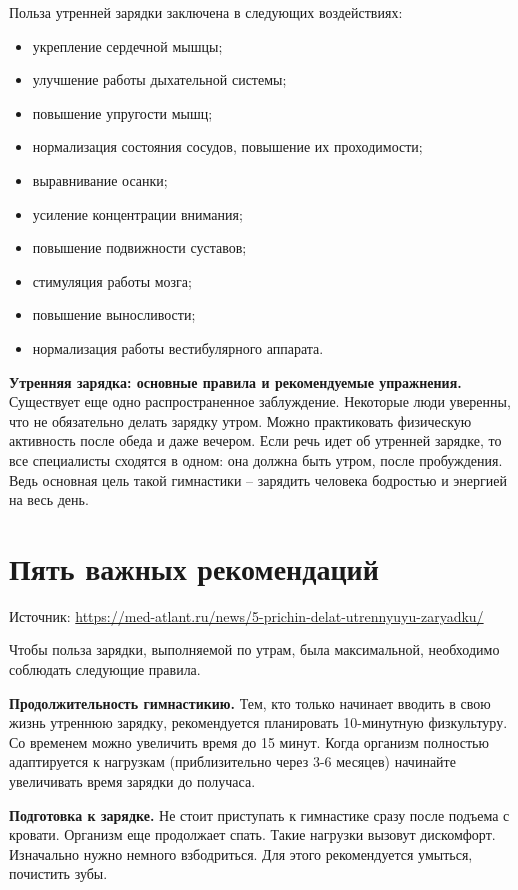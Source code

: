 Польза утренней зарядки заключена в следующих воздействиях:

\begin{itemize}
    \item укрепление сердечной мышцы;
    \item улучшение работы дыхательной системы;
    \item повышение упругости мышц;
    \item нормализация состояния сосудов, повышение их проходимости;
    \item выравнивание осанки;
    \item усиление концентрации внимания;
    \item повышение подвижности суставов;
    \item стимуляция работы мозга;
    \item повышение выносливости;
    \item нормализация работы вестибулярного аппарата.
\end{itemize}

\textbf{Утренняя зарядка: основные правила и рекомендуемые упражнения.} Существует еще одно распространенное заблуждение. Некоторые люди уверенны, что не обязательно делать зарядку утром. Можно практиковать физическую активность после обеда и даже вечером. Если речь идет об утренней зарядке, то все специалисты сходятся в одном: она должна быть утром, после пробуждения. Ведь основная цель такой гимнастики – зарядить человека бодростью и энергией на весь день.

\newpage
\section{Пять важных рекомендаций}
Источник: \url{https://med-atlant.ru/news/5-prichin-delat-utrennyuyu-zaryadku/}

Чтобы польза зарядки, выполняемой  по утрам, была максимальной, необходимо соблюдать следующие правила.

\textbf{Продолжительность гимнастикию.} Тем, кто только начинает вводить в свою жизнь утреннюю зарядку, рекомендуется планировать 10-минутную физкультуру. Со временем можно увеличить время до 15 минут. Когда организм полностью адаптируется к нагрузкам (приблизительно через 3-6 месяцев) начинайте увеличивать время зарядки до получаса.

\textbf{Подготовка к зарядке.} Не стоит приступать к гимнастике сразу после подъема с кровати. Организм еще продолжает спать. Такие нагрузки вызовут дискомфорт. Изначально нужно немного взбодриться. Для этого рекомендуется умыться, почистить зубы.

